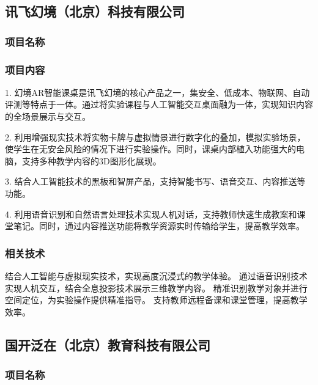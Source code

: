 \subsection{讯飞幻境（北京）科技有限公司}


\subsubsection{项目名称}


\subsubsection{项目内容}

1. 幻境AR智能课桌是讯飞幻境的核心产品之一，集安全、低成本、物联网、自动评测等特点于一体。通过将实验课程与人工智能交互桌面融为一体，实现知识内容的全场景展示与交互。

2. 利用增强现实技术将实物卡牌与虚拟情景进行数字化的叠加，模拟实验场景，使学生在无安全风险的情况下进行实验操作。同时，课桌内部植入功能强大的电脑，支持多种教学内容的3D图形化展现。

3. 结合人工智能技术的黑板和智屏产品，支持智能书写、语音交互、内容推送等功能。

4. 利用语音识别和自然语言处理技术实现人机对话，支持教师快速生成教案和课堂笔记。同时，通过内容推送功能将教学资源实时传输给学生，提高教学效率。

\subsubsection{相关技术}

结合人工智能与虚拟现实技术，实现高度沉浸式的教学体验。
通过语音识别技术实现人机交互，结合全息投影技术展示三维教学内容。
精准识别教学对象并进行空间定位，为实验操作提供精准指导。
支持教师远程备课和课堂管理，提高教学效率。


\subsection{国开泛在（北京）教育科技有限公司}


\subsubsection{项目名称}

